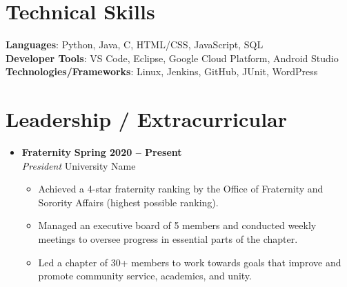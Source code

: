 \documentclass[letterpaper,5pt]{article}
\newcommand{\smalltextbullet}{\,\begin{picture}(-1,1)(-1,-3)\circle*{3}\end{picture}\ }
\begin{document}
    \section{\textbf{Technical Skills}}
    \begin{itemize}[leftmargin=0.15in, label={}]
        \small{\item{
            \textbf{Languages}{: Python, Java, C, HTML/CSS, JavaScript, SQL} \\
            \textbf{Developer Tools}{: VS Code, Eclipse, Google Cloud Platform, Android Studio} \\
            \textbf{Technologies/Frameworks}{: Linux, Jenkins, GitHub, JUnit, WordPress} \\
        }}
    \end{itemize}
    \vspace{-16pt}
    
    \section{\textbf{Leadership / Extracurricular}}
    \begin{itemize}
        \item[]
            \textbf{Fraternity} \hfill \textbf{Spring 2020 -- Present} \\
            \textit{President} \hfill University Name
            \begin{itemize}
                \vspace*{-2mm}
                \item[\smalltextbullet] Achieved a 4-star fraternity ranking by the Office of Fraternity and Sorority Affairs (highest possible ranking).
                \item[\smalltextbullet] Managed an executive board of 5 members and conducted weekly meetings to oversee progress in essential parts of the chapter.
                \item[\smalltextbullet] Led a chapter of 30+ members to work towards goals that improve and promote community service, academics, and unity.
            \end{itemize}
    \end{itemize}
    
\end{document}
